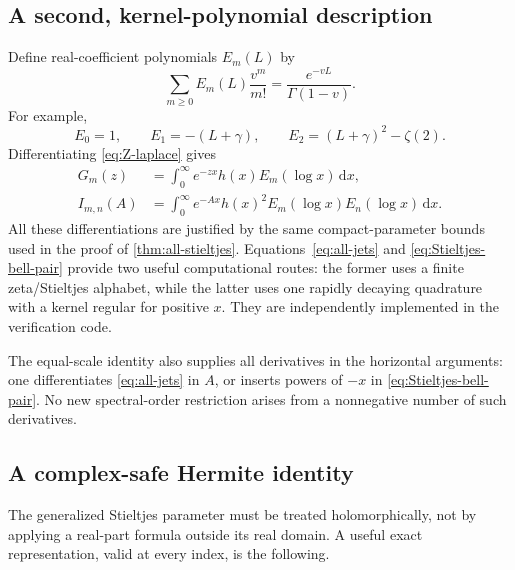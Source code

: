 \documentclass[11pt,a4paper]{article}
\theoremstyle{definition}
\numberwithin{equation}{section}
\newcommand{\dd}{\,\mathrm d}
\begin{document}
\subsection{A second, kernel-polynomial description}
Define real-coefficient polynomials $E_m(L)$ by
\begin{equation}\label{eq:E-generating}
 \sum_{m\ge0}E_m(L)\frac{v^m}{m!}
          =\frac{e^{-vL}}{\Gamma(1-v)}.
\end{equation}
For example,
\[
 E_0=1,\qquad E_1=-(L+\gamma),\qquad
 E_2=(L+\gamma)^2-\zeta(2).
\]
Differentiating \eqref{eq:Z-laplace} gives
\begin{align}
 G_m(z)&=\int_0^\infty e^{-zx}h(x)E_m(\log x)\dd x,
               \label{eq:G-bell-laplace}\\
 I_{m,n}(A)&=\int_0^\infty e^{-Ax}h(x)^2
                  E_m(\log x)E_n(\log x)\dd x.
               \label{eq:Stieltjes-bell-pair}
\end{align}
All these differentiations are justified by the same compact-parameter
bounds used in the proof of \cref{thm:all-stieltjes}.
Equations~\eqref{eq:all-jets} and \eqref{eq:Stieltjes-bell-pair} provide two
useful computational routes: the former uses a finite zeta/Stieltjes
alphabet, while the latter uses one rapidly decaying quadrature with a kernel regular for positive $x$. They are independently implemented in the verification code.

The equal-scale identity also supplies all derivatives in the horizontal
arguments: one differentiates \eqref{eq:all-jets} in $A$, or inserts powers
of $-x$ in \eqref{eq:Stieltjes-bell-pair}. No new spectral-order restriction
arises from a nonnegative number of such derivatives.

\subsection{A complex-safe Hermite identity}
The generalized Stieltjes parameter must be treated holomorphically, not by
applying a real-part formula outside its real domain. A useful exact
representation, valid at every index, is the following.
\end{document}
